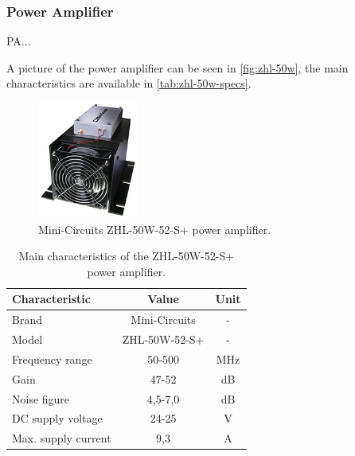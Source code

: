 \subsubsection{Power Amplifier}

PA...

A picture of the power amplifier can be seen in \autoref{fig:zhl-50w}, the main characteristics are available in \autoref{tab:zhl-50w-specs}.

\begin{figure}[!ht]
    \begin{center}
        \includegraphics[width=0.3\textwidth]{figures/zhl-50w.png}
        \caption{Mini-Circuits ZHL-50W-52-S+ power amplifier.}
        \label{fig:zhl-50w}
    \end{center}
\end{figure}

\begin{table}[ht]
    \centering
    \begin{tabular}{lcc}
        \toprule[1.5pt]
        \textbf{Characteristic} & \textbf{Value}    & \textbf{Unit} \\
        \midrule
        Brand                   & Mini-Circuits     & - \\
        Model                   & ZHL-50W-52-S+     & - \\
        Frequency range         & 50-500            & MHz \\
        Gain                    & 47-52             & dB \\
        Noise figure            & 4,5-7,0           & dB \\
        DC supply voltage       & 24-25             & V \\
        Max. supply current     & 9,3               & A \\
        \bottomrule[1.5pt]
    \end{tabular}
    \caption{Main characteristics of the ZHL-50W-52-S+ power amplifier.}
    \label{tab:zhl-50w-specs}
\end{table}

